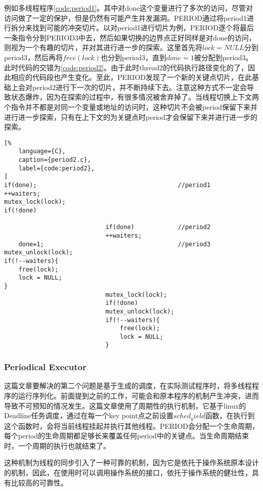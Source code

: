 例如多线程程序\autoref{code:period1}。其中对done这个变量进行了多次的访问，尽管对访问做了一定的保护，但是仍然有可能产生并发漏洞。PERIOD通过将period1进行拆分来找到可能的冲突切片。以对period1进行切片为例，PERIOD逐个将最后一条指令分到PERIOD3中去，然后如果切换的边界点正好同样是对done的访问，则视为一个有趣的切片，并对其进行进一步的探索。这里首先将$lock = NULL$分到period3，然后再将$free(lock)$也分到period3，直到$done = 1$被分配到period3。此时代码的交错为\autoref{code:period2}。由于此时thread2的代码执行路径变化的了，因此相应的代码段也产生变化。至此，PERIOD发现了一个新的关键点切片，在此基础上会对period2进行下一次的切片，并不断持续下去。注意这种方式不一定会导致状态爆炸，因为在探索的过程中，有很多情况被舍弃掉了。当线程切换上下文两个指令并不都是对同一个变量或地址的访问时，这种切片不会被period保留下来并进行进一步探索，只有在上下文的为关键点时period才会保留下来并进行进一步的探索。

\begin{lstlisting}[%
    language={C},
    caption={period2.c},
    label={code:period2},
]
if(done);                                       //period1
++waiters;
mutex_lock(lock); 
if(!done) 

                            if(done)            //period2
                            ++waiters;
    done=1;                                     //period3
mutex_unlock(lock); 
if(!--waiters){ 
    free(lock); 
    lock = NULL; 
} 
                            mutex_lock(lock); 
                            if(!done)
                            mutex_unlock(lock);
                            if(!--waiters){ 
                                free(lock); 
                                lock = NULL; 
                            }
\end{lstlisting}

\subsubsection{Periodical Executor}

这篇文章要解决的第二个问题是基于生成的调度，在实际测试程序时，将多线程程序的运行序列化。前面提到之前的工作，可能会和原本程序的机制产生冲突，进而导致不可预知的情况发生。这篇文章使用了周期性的执行机制，它基于linux的Deadline任务调度，通过在每一个key point点之前设置$sched_yield$函数，在执行到这个函数时，会将当前线程挂起并执行其他线程。PERIOD会分配一个生命周期，每个period的生命周期都足够长来覆盖任何period中的关键点。当生命周期结束时，一个周期的执行也就结束了。

这种机制为线程的同步引入了一种可靠的机制，因为它是依托于操作系统原本设计的机制，因此，在使用时可以调用操作系统的接口，依托于操作系统的健壮性，具有比较高的可靠性。

